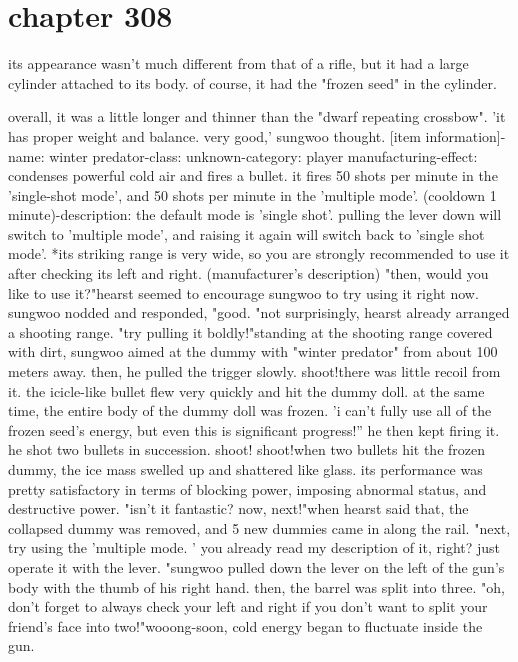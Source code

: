 \section{chapter 308}

its appearance wasn't much different from that of a rifle, but it had a large cylinder attached to its body.
 of course, it had the "frozen seed" in the cylinder.





overall, it was a little longer and thinner than the "dwarf repeating crossbow".
'it has proper weight and balance.
 very good,' sungwoo thought.
[item information]-name: winter predator-class: unknown-category: player manufacturing-effect: condenses powerful cold air and fires a bullet.
 it fires 50 shots per minute in the 'single-shot mode', and 50 shots per minute in the 'multiple mode'.
 (cooldown 1 minute)-description: the default mode is 'single shot'.
 pulling the lever down will switch to 'multiple mode', and raising it again will switch back to 'single shot mode'.
*its striking range is very wide, so you are strongly recommended to use it after checking its left and right.
 (manufacturer's description) "then, would you like to use it?"hearst seemed to encourage sungwoo to try using it right now.
sungwoo nodded and responded, "good.
"not surprisingly, hearst already arranged a shooting range.
"try pulling it boldly!"standing at the shooting range covered with dirt, sungwoo aimed at the dummy with "winter predator" from about 100 meters away.
 then, he pulled the trigger slowly.
shoot!there was little recoil from it.
 the icicle-like bullet flew very quickly and hit the dummy doll.
 at the same time, the entire body of the dummy doll was frozen.
'i can't fully use all of the frozen seed's energy, but even this is significant progress!''
he then kept firing it.
 he shot two bullets in succession.
 shoot! shoot!when two bullets hit the frozen dummy, the ice mass swelled up and shattered like glass.
its performance was pretty satisfactory in terms of blocking power, imposing abnormal status, and destructive power.
"isn't it fantastic? now, next!"when hearst said that, the collapsed dummy was removed, and 5 new dummies came in along the rail.
"next, try using the 'multiple mode.
' you already read my description of it, right? just operate it with the lever.
"sungwoo pulled down the lever on the left of the gun's body with the thumb of his right hand.
 then, the barrel was split into three.
 "oh, don't forget to always check your left and right if you don't want to split your friend's face into two!"wooong-soon, cold energy began to fluctuate inside the gun.
